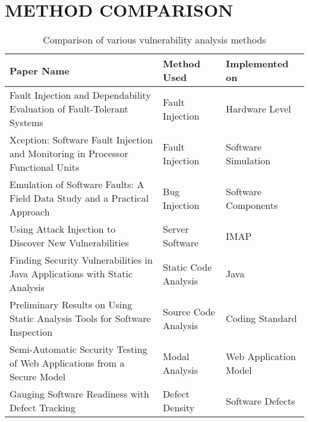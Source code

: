 \section{ METHOD COMPARISON}

\begin{table}[H]
	\begin{center}
	\caption{Comparison of various vulnerability analysis methods}
	\label{t1}
	\begin{tabular}{ | m{7cm} | m{3cm}| m{3.5cm} | }%
		\hline \qquad \qquad \textbf{Paper Name}  & \textbf{Method Used} & \textbf{Implemented on} \\ 
		\hline Fault Injection and
		Dependability Evaluation of Fault-Tolerant Systems  & Fault Injection  & Hardware Level \\ 
		\hline Xception: Software Fault Injection and Monitoring in Processor Functional Units & Fault Injection & Software Simulation \\ 
		\hline Emulation of Software Faults:
		 A Field Data Study and a Practical Approach & Bug Injection & Software Components \\ 
		\hline Using Attack Injection to Discover 
		New Vulnerabilities  & Server Software & IMAP \\ 
		\hline Finding Security Vulnerabilities in Java Applications with	Static Analysis & Static Code Analysis & Java \\ 
		\hline Preliminary Results on Using Static Analysis Tools for Software Inspection  & Source Code Analysis & Coding Standard \\ 
		\hline Semi-Automatic Security Testing of  Web
		Applications from a Secure Model  & Modal Analysis & Web Application Model \\ 
		\hline 
		Gauging Software Readiness with Defect Tracking
		 & Defect Density & Software Defects\\
		 \hline
 
	\end{tabular} 
\end{center}
\end{table}





